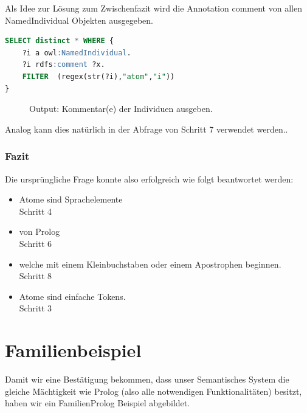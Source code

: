 Als Idee zur Lösung zum Zwischenfazit wird die Annotation comment von allen NamedIndividual Objekten ausgegeben.


\begin{lstlisting}[caption={Kommentar(e) der Individuen ausgeben},captionpos=b,language=SQL]
SELECT distinct * WHERE { 
	?i a owl:NamedIndividual.
	?i rdfs:comment ?x.
	FILTER  (regex(str(?i),"atom","i"))
}
\end{lstlisting}

\begin{figure}[H]
\centering {}
\caption{Output: Kommentar(e) der Individuen ausgeben.\label{fig:atom_8}\protect\footnotemark}
\end{figure}

Analog kann dies natürlich in der Abfrage von Schritt 7 verwendet werden..

\subsubsection{Fazit}
\label{sssec:anh_beispiel_c_8_1}

Die ursprüngliche Frage konnte also erfolgreich wie folgt beantwortet werden:

\begin{itemize}
		\item Atome sind Sprachelemente \\
		Schritt 4
		\item von Prolog\\
		Schritt 6
		\item welche mit einem Kleinbuchstaben oder einem Apostrophen beginnen.\\
		Schritt 8
		\item Atome sind einfache Tokens.\\
		Schritt 3
\end{itemize}

\section{Familienbeispiel}
\label{sec:anh_beispiel_g}

Damit wir eine Bestätigung bekommen, dass unser Semantisches System die gleiche Mächtigkeit wie Prolog (also alle notwendigen Funktionalitäten) besitzt, haben wir ein FamilienProlog Beispiel abgebildet.

